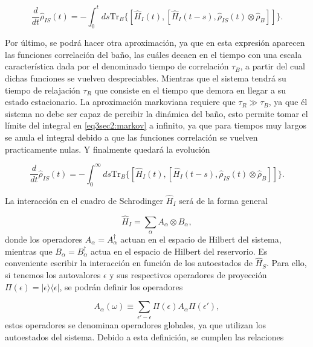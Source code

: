 \begin{equation}
    \frac{d}{dt}\hat{\rho}_{IS}(t) = -  \int_{0}^{t}ds \text{Tr}_{B}\{[\hat{H}_{I}(t), [\hat{H}_{I}(t-s),\hat{\rho}_{IS}(t) \otimes \hat{\rho}_{B}]]\}.
    \label{eq3sec2:markov}
\end{equation} 

Por último, se podrá hacer otra aproximación, ya que en esta expresión aparecen las funciones correlación del baño, las cuáles decaen en el tiempo con una escala característica dada por el denominado tiempo de correlación $\tau_{B}$, a partir del cual dichas funciones se vuelven despreciables. Mientras que el sistema tendrá su tiempo de relajación $\tau_{R}$ que consiste en el tiempo que demora en llegar a su estado estacionario. La aproximación markoviana requiere que $\tau_{R}\gg \tau_{B}$, ya que él sistema no debe ser capaz de percibir la dinámica del baño, esto permite tomar el límite del integral en \ref{eq3sec2:markov} a infinito, ya que para tiempos muy largos se anula el integral debido a que las funciones correlación se vuelven practicamente nulas. Y finalmente quedará la evolución

\begin{equation}
    \frac{d}{dt}\hat{\rho}_{IS}(t) = -  \int_{0}^{\infty}ds \text{Tr}_{B}\{[\hat{H}_{I}(t), [\hat{H}_{I}(t-s),\hat{\rho}_{IS}(t) \otimes \hat{\rho}_{B}]]\}.
    \label{eq3sec2:markov1}
\end{equation} 

La interacción en el cuadro de Schrodinger $\hat{H}_{I}$ será de la forma general

\begin{equation*}
    \hat{H}_{I} = \sum_{\alpha}A_{\alpha} \otimes B_{\alpha},
\end{equation*}
donde los operadores $A_{\alpha} = A^{\dagger}_{\alpha}$ actuan en el espacio de Hilbert del sistema, mientras que $B_{\alpha}=B^{\dagger}_{\alpha}$ actua en el espacio de Hilbert del reservorio. Es conveniente escribir la interacción en función de los autoestados de $\hat{H}_{S}$. Para ello, si tenemos los autovalores $\epsilon$ y sus respectivos operadores de proyección $\Pi(\epsilon) = |\epsilon\rangle \langle \epsilon|$, se podrán definir los operadores

\begin{equation*}
    A_{\alpha}(\omega) \equiv \sum_{\epsilon' - \epsilon}\Pi(\epsilon)A_{\alpha}\Pi(\epsilon'), 
\end{equation*}
estos operadores se denominan operadores globales, ya que utilizan los autoestados del sistema. Debido a esta definición, se cumplen las relaciones

